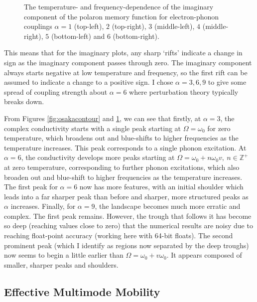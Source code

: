 \begin{figure}[t]
    \caption{The temperature- and frequency-dependence of the imaginary component of the polaron memory function for electron-phonon couplings $\alpha = 1$ (top-left), $2$ (top-right), $3$ (middle-left), $4$ (middle-right), $5$ (bottom-left) and $6$ (bottom-right).}
    \label{fig:osakaridge}
\end{figure}
\FloatBarrier  

This means that for the imaginary plots, any sharp `rifts' indicate a change in sign as the imaginary component passes through zero. The imaginary component always starts negative at low temperature and frequency, so the first rift can be assumed to indicate a change to a positive sign. I chose $\alpha = 3, 6, 9$ to give some spread of coupling strength about $\alpha = 6$ where perturbation theory typically breaks down. 

From Figures \ref{fig:osakacontour} and \ref{fig:osakaridge}, we can see that firstly, at $\alpha = 3$, the complex conductivity starts with a single peak starting at $\Omega = \omega_0$ for zero temperature, which broadens out and blue-shifts to higher frequencies as the temperature increases. This peak corresponds to a single phonon excitation. At $\alpha = 6$, the conductivity develops more peaks starting at $\Omega = \omega_0 + n \omega_0 v,\ n \in \mathbb{Z}^+$ at zero temperature, corresponding to further phonon excitations, which also broaden out and blue-shift to higher frequencies as the temperature increases. The first peak for $\alpha = 6$ now has more features, with an initial shoulder which leads into a far sharper peak than before and sharper, more structured peaks as $\alpha$ increases. Finally, for $\alpha = 9$, the landscape becomes much more erratic and complex. The first peak remains. However, the trough that follows it has become so deep (reaching values close to zero) that the numerical results are noisy due to reaching float-point accuracy (working here with 64-bit floats). The second prominent peak (which I identify as regions now separated by the deep troughs) now seems to begin a little earlier than $\Omega = \omega_0 + v \omega_0$. It appears composed of smaller, sharper peaks and shoulders. 

\subsection{Effective Multimode Mobility}
\label{subsec:2-3-3}

